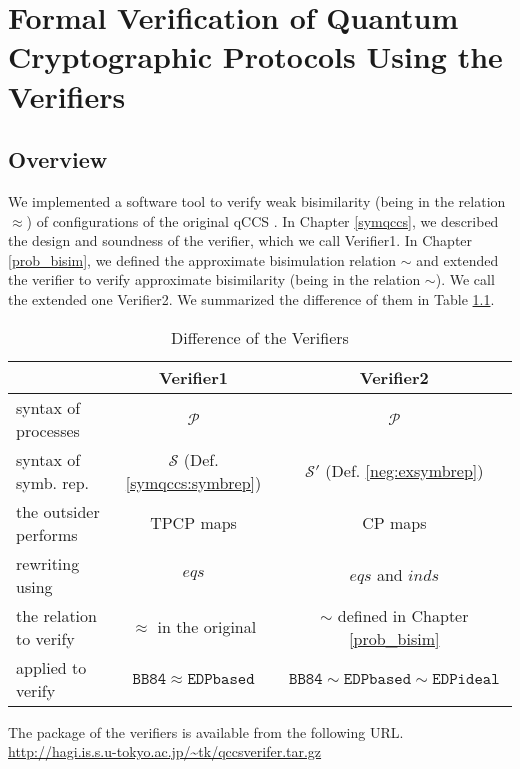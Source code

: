 \chapter{Formal Verification of Quantum Cryptographic Protocols Using
the Verifiers}
\label{formaliz}
\section{Overview}
We implemented a software tool to verify weak bisimilarity 
(being in the relation $\approx$) of
configurations of the original qCCS \cite{DengFeng2012}.
In Chapter \ref{symqccs}, we described
the design and soundness of the verifier, which
we call Verifier1.
In Chapter \ref{prob_bisim},
we defined the approximate bisimulation relation $\sim$ and
extended the verifier to verify approximate
bisimilarity (being in the relation $\sim$).
We call the extended one Verifier2.
We summarized the difference
of them in Table \ref{fml:differofverifers}.
\begin{table}[htb]
  \begin{tabular}{|l|c|c|} \hline
   ~ & Verifier1 & Verifier2 \\ \hline
   syntax of processes & $\mathcal{P}$ & $\mathcal{P}$ \\
   syntax of symb. rep. & $\mathcal{S}$ (Def. \ref{symqccs:symbrep})
       & $\mathcal{S'}$
	   (Def. \ref{neg:exsymbrep}) \\
   the outsider performs & TPCP maps & CP maps \\
   rewriting using & $\mathit{eqs}$ & $\mathit{eqs}$ and
	   $\mathit{inds}$ \\
   the relation to verify & $\approx$ in the original
       \cite{DengFeng2012} & $\sim$ defined in Chapter \ref{prob_bisim}
	   \\ 
   applied to verify & $\mathtt{BB84} \approx \mathtt{EDPbased}$ & 
	   $\mathtt{BB84} \sim \mathtt{EDPbased} \sim
	   \mathtt{EDPideal}$ \\\hline
  \end{tabular}
\caption{Difference of the Verifiers}
\label{fml:differofverifers}
\end{table}
The package of the verifiers is available from the following URL.
\url{http://hagi.is.s.u-tokyo.ac.jp/~tk/qccsverifer.tar.gz}


